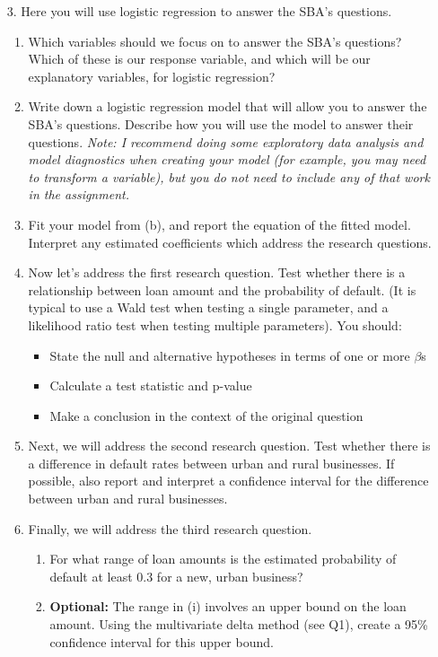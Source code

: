 \documentclass[11pt]{article}
\begin{document}
\begin{enumerate}
\item[3.] Here you will use logistic regression to answer the SBA's questions.

\begin{enumerate}
\item Which variables should we focus on to answer the SBA's questions? Which of these is our response variable, and which will be our explanatory variables, for logistic regression?


\item Write down a logistic regression model that will allow you to answer the SBA's questions. Describe how you will use the model to answer their questions. \textit{Note: I recommend doing some exploratory data analysis and model diagnostics when creating your model (for example, you may need to transform a variable), but you do not need to include any of that work in the assignment.}

\item Fit your model from (b), and report the equation of the fitted model. Interpret any estimated coefficients which address the research questions.

\item Now let's address the first research question. Test whether there is a relationship between loan amount and the probability of default. (It is typical to use a Wald test when testing a single parameter, and a likelihood ratio test when testing multiple parameters). You should:
\begin{itemize}
\item State the null and alternative hypotheses in terms of one or more $\beta$s
\item Calculate a test statistic and p-value
\item Make a conclusion in the context of the original question
\end{itemize}

\item Next, we will address the second research question. Test whether there is a difference in default rates between urban and rural businesses. If possible, also report and interpret a confidence interval for the difference between urban and rural businesses.


\item Finally, we will address the third research question. 
\begin{enumerate}
\item For what range of loan amounts is the estimated probability of default at least 0.3 for a new, urban business?
\item \textbf{Optional:} The range in (i) involves an upper bound on the loan amount. Using the multivariate delta method (see Q1), create a 95\% confidence interval for this upper bound.
\end{enumerate}

\end{enumerate} 
\end{enumerate}
\end{document}
